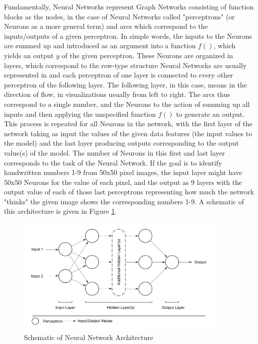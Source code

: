 Fundamentally, Neural Networks represent Graph Networks consisting of function blocks as the nodes, in the case of Neural Networks called "perceptrons" (or Neurons as a more general term) and arcs which correspond to the inputs/outputs of a given perceptron. In simple words, the inputs to the Neurons are summed up and introduced as an argument into a function $f()$, which yields an output $y$ of the given perceptron. These Neurons are organized in layers, which correspond to the row-type structure Neural Networks are usually represented in and each perceptron of one layer is connected to every other perceptron of the following layer. The following layer, in this case, means in the direction of flow, in visualizations usually from left to right. The arcs thus correspond to a single number, and the Neurons to the action of summing up all inputs and then applying the unspecified function $f()$ to generate an output. This process is repeated for all Neurons in the network, with the first layer of the network taking as input the values of the given data features (the input values to the model) and the last layer producing outputs corresponding to the output value(s) of the model. The number of Neurons in this first and last layer corresponds to the task of the Neural Network. If the goal is to identify handwritten numbers 1-9 from 50x50 pixel images, the input layer might have 50x50 Neurons for the value of each pixel, and the output as 9 layers with the output value of each of those last perceptrons representing how much the network "thinks" the given image shows the corresponding numbers 1-9. A schematic of this architecture is given in Figure \ref{fig:neural_network_architecture}.

\begin{figure}[h] 
\centering
\includegraphics[width=0.9\textwidth]{figures/modelling/neural_network_concept.png} %
\caption{Schematic of Neural Network Architecture}
\label{fig:neural_network_architecture}
\end{figure}

